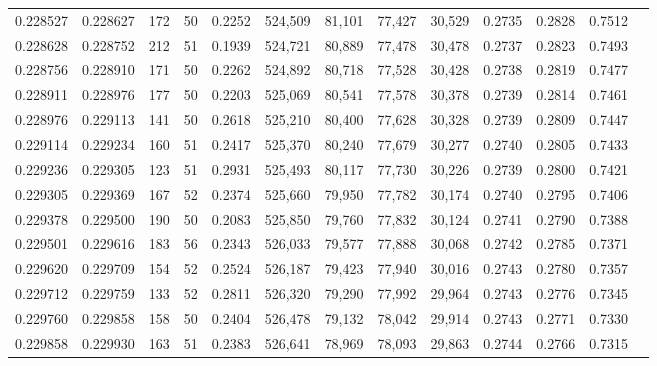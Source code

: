 \begin{tabular}{rrrrrrrrrrrrr}
0.228527 & 0.228627 &   172 &  50 &                                     0.2252 & 524,509 &  81,101 &  77,427 &  30,529 & 0.2735 & 0.2828 & 0.7512 \\
0.228628 & 0.228752 &   212 &  51 &                                     0.1939 & 524,721 &  80,889 &  77,478 &  30,478 & 0.2737 & 0.2823 & 0.7493 \\
0.228756 & 0.228910 &   171 &  50 &                                     0.2262 & 524,892 &  80,718 &  77,528 &  30,428 & 0.2738 & 0.2819 & 0.7477 \\
0.228911 & 0.228976 &   177 &  50 &                                     0.2203 & 525,069 &  80,541 &  77,578 &  30,378 & 0.2739 & 0.2814 & 0.7461 \\
0.228976 & 0.229113 &   141 &  50 &                                     0.2618 & 525,210 &  80,400 &  77,628 &  30,328 & 0.2739 & 0.2809 & 0.7447 \\
0.229114 & 0.229234 &   160 &  51 &                                     0.2417 & 525,370 &  80,240 &  77,679 &  30,277 & 0.2740 & 0.2805 & 0.7433 \\
0.229236 & 0.229305 &   123 &  51 &                                     0.2931 & 525,493 &  80,117 &  77,730 &  30,226 & 0.2739 & 0.2800 & 0.7421 \\
0.229305 & 0.229369 &   167 &  52 &                                     0.2374 & 525,660 &  79,950 &  77,782 &  30,174 & 0.2740 & 0.2795 & 0.7406 \\
0.229378 & 0.229500 &   190 &  50 &                                     0.2083 & 525,850 &  79,760 &  77,832 &  30,124 & 0.2741 & 0.2790 & 0.7388 \\
0.229501 & 0.229616 &   183 &  56 &                                     0.2343 & 526,033 &  79,577 &  77,888 &  30,068 & 0.2742 & 0.2785 & 0.7371 \\
0.229620 & 0.229709 &   154 &  52 &                                     0.2524 & 526,187 &  79,423 &  77,940 &  30,016 & 0.2743 & 0.2780 & 0.7357 \\
0.229712 & 0.229759 &   133 &  52 &                                     0.2811 & 526,320 &  79,290 &  77,992 &  29,964 & 0.2743 & 0.2776 & 0.7345 \\
0.229760 & 0.229858 &   158 &  50 &                                     0.2404 & 526,478 &  79,132 &  78,042 &  29,914 & 0.2743 & 0.2771 & 0.7330 \\
0.229858 & 0.229930 &   163 &  51 &                                     0.2383 & 526,641 &  78,969 &  78,093 &  29,863 & 0.2744 & 0.2766 & 0.7315 \\

\end{tabular}
